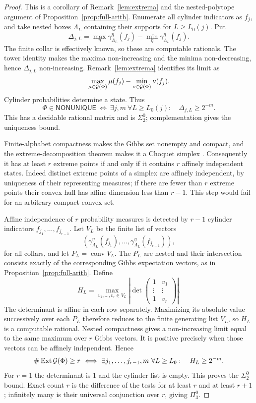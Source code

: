 \begin{proof}
This is a corollary of Remark~\ref{lem:extrema} and the nested-polytope argument of Proposition~\ref{prop:full-arith}. Enumerate all cylinder indicators as $f_j$, and take nested boxes $\Lambda_L$ containing their supports for $L\ge L_0(j)$. Put
\[
 \Delta_{j,L}=\max_\eta\gamma_{\Lambda_L}^{\eta}(f_j)
                 -\min_\eta\gamma_{\Lambda_L}^{\eta}(f_j).
\]
The finite collar is effectively known, so these are computable rationals. The tower identity makes the maxima non-increasing and the minima non-decreasing, hence $\Delta_{j,L}$ non-increasing. Remark~\ref{lem:extrema} identifies its limit as
\[
 \max_{\mu\in\mathcal G(\Phi)}\mu(f_j)-\min_{\nu\in\mathcal G(\Phi)}\nu(f_j).
\]
Cylinder probabilities determine a state. Thus
\[
 \Phi\in\mathsf{NONUNIQUE}
 \ \Longleftrightarrow\
 \exists j,m\ \forall L\ge L_0(j):\quad\Delta_{j,L}\ge2^{-m}.
\]
This has a decidable rational matrix and is $\Sigma^0_2$; complementation gives the uniqueness bound.

Finite-alphabet compactness makes the Gibbs set nonempty and compact, and the extreme-decomposition theorem makes it a Choquet simplex \cite[Theorem 7.26 and Corollary 7.29]{Georgii}. Consequently it has at least $r$ extreme points if and only if it contains $r$ affinely independent states. Indeed distinct extreme points of a simplex are affinely independent, by uniqueness of their representing measures; if there are fewer than $r$ extreme points their convex hull has affine dimension less than $r-1$. This step would fail for an arbitrary compact convex set.

Affine independence of $r$ probability measures is detected by $r-1$ cylinder indicators $f_{j_1},\ldots,f_{j_{r-1}}$. Let $V_L$ be the finite list of vectors
\[
 (\gamma_{\Lambda_L}^{\eta}(f_{j_1}),\ldots,
       \gamma_{\Lambda_L}^{\eta}(f_{j_{r-1}})),
\]
for all collars, and let $P_L=\operatorname{conv}V_L$. The $P_L$ are nested and their intersection consists exactly of the corresponding Gibbs expectation vectors, as in Proposition~\ref{prop:full-arith}. Define
\[
 H_L=\max_{v_1,\ldots,v_r\in V_L}
 \left|\det\begin{pmatrix}1&v_1\\[-2pt]\vdots&\vdots\\1&v_r\end{pmatrix}\right|.
\]
The determinant is affine in each row separately. Maximizing its absolute value successively over each $P_L$ therefore reduces to the finite generating list $V_L$, so $H_L$ is a computable rational. Nested compactness gives a non-increasing limit equal to the same maximum over $r$ Gibbs vectors. It is positive precisely when those vectors can be affinely independent. Hence
\[
 \#\operatorname{Ext}\mathcal G(\Phi)\ge r
 \ \Longleftrightarrow\
 \exists j_1,\ldots,j_{r-1},m\ \forall L\ge L_0:\quad H_L\ge2^{-m}.
\]
For $r=1$ the determinant is $1$ and the cylinder list is empty. This proves the $\Sigma^0_2$ bound. Exact count $r$ is the difference of the tests for at least $r$ and at least $r+1$; infinitely many is their universal conjunction over $r$, giving $\Pi^0_3$.


\end{proof}
